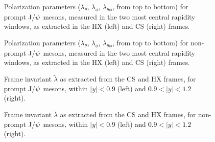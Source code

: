 \documentclass[12pt]{article}
\newcommand{\JPsi}{J/$\psi$}
\begin{document}
\begin{figure}[htbp]
\centering
{}
\caption{Polarization parameters ($\lambda_\theta$, $\lambda_\phi$,
  $\lambda_{\theta\phi}$, from top to bottom) for prompt \JPsi\
  mesons, measured in the two most central rapidity windows, as
  extracted in the HX (left) and CS (right) frames.}
\end{figure}
\clearpage

\begin{figure}[htbp]
\centering
{}
\caption{Polarization parameters ($\lambda_\theta$, $\lambda_\phi$,
  $\lambda_{\theta\phi}$, from top to bottom) for non-prompt \JPsi\
  mesons, measured in the two most central rapidity windows, as
  extracted in the HX (left) and CS (right) frames.}
\end{figure}
\clearpage

\begin{figure}[htbp]
\centering
{}
\caption{Frame invariant $\tilde{\lambda}$ as extracted from
  the CS and HX frames, for prompt \JPsi\ mesons, within $|y| < 0.9$ (left)
  and $0.9 < |y| < 1.2$ (right).}
\end{figure}

\begin{figure}[htbp]
\centering
{}
\caption{Frame invariant $\tilde{\lambda}$ as extracted from
  the CS and HX frames, for non-prompt \JPsi\ mesons, within $|y| < 0.9$
  (left) and $0.9 < |y| < 1.2$ (right).}
\end{figure}
\clearpage
\end{document}

